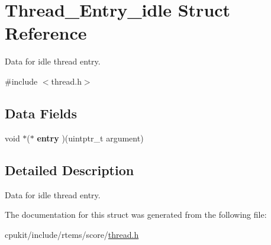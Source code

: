 \hypertarget{structThread__Entry__idle}{}\section{Thread\+\_\+\+Entry\+\_\+idle Struct Reference}
\label{structThread__Entry__idle}


Data for idle thread entry.  




{\ttfamily \#include $<$thread.\+h$>$}

\subsection*{Data Fields}
\begin{DoxyCompactItemize}
\item 
\mbox{\label{structThread__Entry__idle_aa8e2c75efe627da465ddbe8bb23dcd1d}} 
void $\ast$($\ast$ {\bfseries entry} )(uintptr\+\_\+t argument)
\end{DoxyCompactItemize}


\subsection{Detailed Description}
Data for idle thread entry. 

The documentation for this struct was generated from the following file\+:\begin{DoxyCompactItemize}
\item 
cpukit/include/rtems/score/\mbox{\hyperlink{score_2thread_8h}{thread.\+h}}\end{DoxyCompactItemize}
